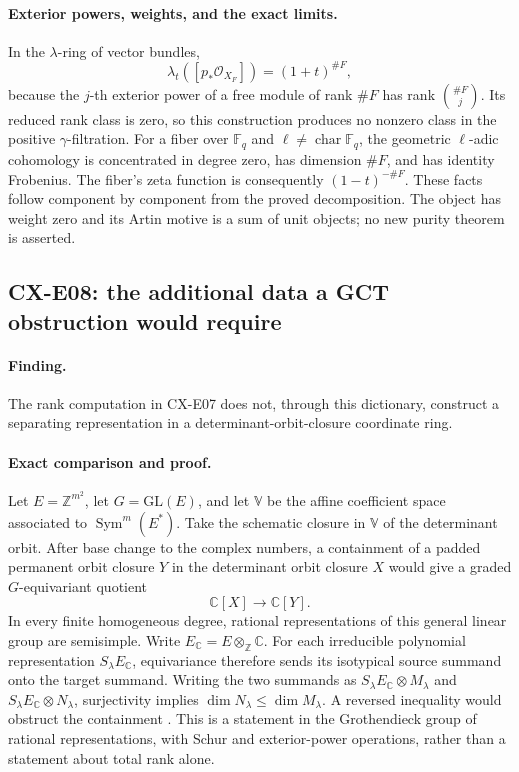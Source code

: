 \documentclass[11pt,a4paper]{article}
\begin{document}
\paragraph{Exterior powers, weights, and the exact limits.}
In the \(\lambda\)-ring of vector bundles,
\[
 \lambda_t([p_*\mathcal O_{X_F}])=(1+t)^{\#F},
\]
because the \(j\)-th exterior power of a free module of rank \(\#F\)
has rank \(\binom{\#F}{j}\).
Its reduced rank class is zero, so this construction produces no
nonzero class in the positive \(\gamma\)-filtration.
For a fiber over \(\mathbb F_q\) and \(\ell\ne\operatorname{char}\mathbb F_q\),
the geometric \(\ell\)-adic cohomology is concentrated in degree zero,
has dimension \(\#F\), and has identity Frobenius.
The fiber's zeta function is consequently
\((1-t)^{-\#F}\).
These facts follow component by component from the proved
decomposition. The object has weight zero and its Artin motive is
a sum of unit objects; no new purity theorem is asserted.

\subsection{CX-E08: the additional data a GCT obstruction would require}
\label{finding:CX-E08}

\paragraph{Finding.}
The rank computation in CX-E07 does not, through this dictionary,
construct a separating representation in a determinant-orbit-closure
coordinate ring.

\paragraph{Exact comparison and proof.}
Let \(E=\mathbb Z^{m^2}\), let \(G=\mathrm{GL}(E)\), and let
\(\mathbb V\) be the affine coefficient space associated to
\(\operatorname{Sym}^m(E^*)\).
Take the schematic closure in \(\mathbb V\) of the determinant orbit.
After base change to the complex numbers, a containment of a padded
permanent orbit closure \(Y\) in the determinant orbit closure \(X\)
would give a graded \(G\)-equivariant quotient
\[
 \mathbb C[X]\longrightarrow\mathbb C[Y].
\]
In every finite homogeneous degree, rational representations of this
general linear group are semisimple.
Write \(E_{\mathbb C}=E\otimes_{\mathbb Z}\mathbb C\).
For each irreducible polynomial representation
\(S_\lambda E_{\mathbb C}\), equivariance
therefore sends its isotypical source summand onto the target
summand. Writing the two summands as
\(S_\lambda E_{\mathbb C}\otimes M_\lambda\) and
\(S_\lambda E_{\mathbb C}\otimes N_\lambda\), surjectivity implies
\(\dim N_\lambda\leq\dim M_\lambda\).
A reversed inequality would obstruct the containment
\cite[\S7.4, (7.6), p.~38, and (7.9), p.~39]{Burgisser2024}.
This is a statement in the Grothendieck group of rational
representations, with Schur and exterior-power operations, rather
than a statement about total rank alone.
\end{document}
